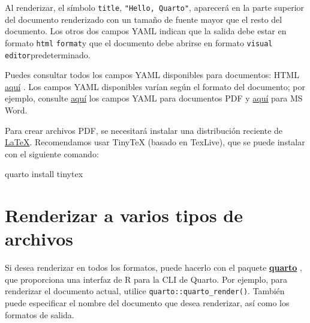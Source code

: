 \documentclass[
  spanish,
  12pt,
  letterpaper,
  DIV=11,
  numbers=noendperiod]{scrreprt}
\newenvironment{Shaded}{\begin{snugshade}}{\end{snugshade}}
\newcommand{\ExtensionTok}[1]{\textcolor[rgb]{0.00,0.23,0.31}{#1}}
\newcommand{\NormalTok}[1]{\textcolor[rgb]{0.00,0.23,0.31}{#1}}
\begin{document}
Al renderizar, el símbolo \texttt{title}, \texttt{"Hello,\ Quarto"},
aparecerá en la parte superior del documento renderizado con un tamaño
de fuente mayor que el resto del documento. Los otros dos campos YAML
indican que la salida debe estar en formato \texttt{html}
\texttt{format}y que el documento debe abrirse en formato
\texttt{visual} \texttt{editor}predeterminado.

Puedes consultar todos los campos YAML disponibles para documentos: HTML
\href{https://quarto.org/docs/reference/formats/html.html}{aquí} . Los
campos YAML disponibles varían según el formato del documento; por
ejemplo, consulte
\href{https://quarto.org/docs/reference/formats/pdf.html}{aquí} los
campos YAML para documentos PDF y
\href{https://quarto.org/docs/reference/formats/docx.html}{aquí} para MS
Word.

\begin{tcolorbox}[enhanced jigsaw, arc=.35mm, bottomrule=.15mm, bottomtitle=1mm, breakable, colback=white, colbacktitle=quarto-callout-important-color!10!white, colframe=quarto-callout-important-color-frame, coltitle=black, left=2mm, leftrule=.75mm, opacityback=0, opacitybacktitle=0.6, rightrule=.15mm, title=\textcolor{quarto-callout-important-color}{\faExclamation}\hspace{0.5em}{Importante}, titlerule=0mm, toprule=.15mm, toptitle=1mm]

Para crear archivos PDF, se necesitará instalar una distribución
reciente de \href{https://www.latex-project.org/}{LaTeX}. Recomendamos
usar TinyTeX (basado en TexLive), que se puede instalar con el siguiente
comando:

\begin{Shaded}
\begin{Highlighting}[]
\ExtensionTok{quarto}\NormalTok{ install tinytex}
\end{Highlighting}
\end{Shaded}

\end{tcolorbox}

\section{Renderizar a varios tipos de
archivos}\label{renderizar-a-varios-tipos-de-archivos}

Si desea renderizar en todos los formatos, puede hacerlo con el paquete
\href{https://github.com/quarto-dev/quarto-r}{\textbf{quarto}} , que
proporciona una interfaz de R para la CLI de Quarto. Por ejemplo, para
renderizar el documento actual, utilice
\texttt{quarto::quarto\_render()}. También puede especificar el nombre
del documento que desea renderizar, así como los formatos de salida.
\end{document}
